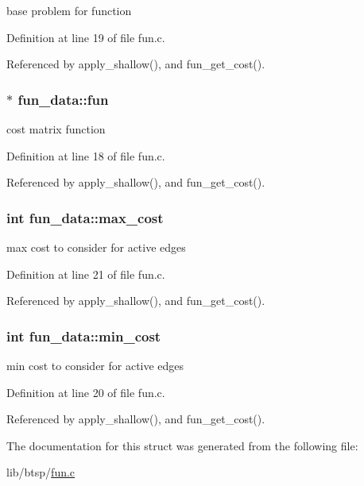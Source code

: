 base problem for function 

Definition at line 19 of file fun.c.

Referenced by apply\_\-shallow(), and fun\_\-get\_\-cost().\hypertarget{structfun__data_a4103cadf3d844dc528d9e02884cfc98}{
\subsubsection[{fun}]{$\ast$ {\bf fun\_\-data::fun}}}
\label{structfun__data_a4103cadf3d844dc528d9e02884cfc98}


cost matrix function 

Definition at line 18 of file fun.c.

Referenced by apply\_\-shallow(), and fun\_\-get\_\-cost().\hypertarget{structfun__data_f149f55b8d22a020fcebd8f55325d1e5}{
\subsubsection[{max\_\-cost}]{\setlength{\rightskip}{0pt plus 5cm}int {\bf fun\_\-data::max\_\-cost}}}
\label{structfun__data_f149f55b8d22a020fcebd8f55325d1e5}


max cost to consider for active edges 

Definition at line 21 of file fun.c.

Referenced by apply\_\-shallow(), and fun\_\-get\_\-cost().\hypertarget{structfun__data_7e1ccad6deed6f629864205a7c25794c}{
\subsubsection[{min\_\-cost}]{\setlength{\rightskip}{0pt plus 5cm}int {\bf fun\_\-data::min\_\-cost}}}
\label{structfun__data_7e1ccad6deed6f629864205a7c25794c}


min cost to consider for active edges 

Definition at line 20 of file fun.c.

Referenced by apply\_\-shallow(), and fun\_\-get\_\-cost().

The documentation for this struct was generated from the following file:\begin{CompactItemize}
\item 
lib/btsp/\hyperlink{fun_8c}{fun.c}\end{CompactItemize}
